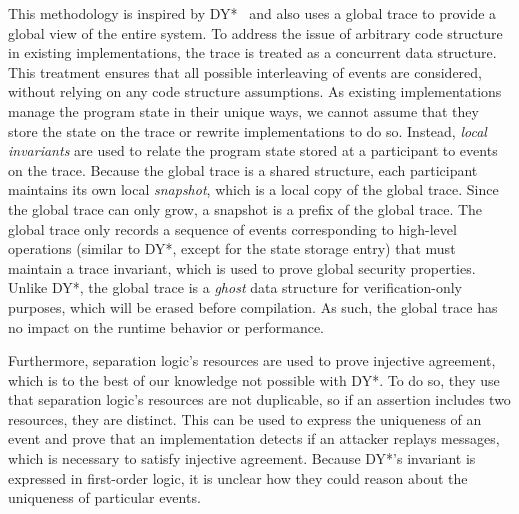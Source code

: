 This methodology is inspired by DY*~\cite{bhargavan2021text} and also uses a global trace to provide a global view of the entire system.
To address the issue of arbitrary code structure in existing implementations, the trace is treated as a concurrent data structure.
This treatment ensures that all possible interleaving of events are considered, without relying on any code structure assumptions.
As existing implementations manage the program state in their unique ways, we cannot assume that they store the state on the trace or rewrite implementations to do so. Instead, \emph{local invariants} are used to relate the program state stored at a participant to events on the trace.
Because the global trace is a shared structure, each participant maintains its own local \emph{snapshot}, which is a local copy of the global trace. Since the global trace can only grow, a snapshot is a prefix of the global trace. 
The global trace only records a sequence of events corresponding to high-level operations (similar to DY*, except for the state storage entry) that must maintain a trace invariant, which is used to prove global security properties.
Unlike DY*, the global trace is a \emph{ghost} data structure for verification-only purposes, which will be erased before compilation. As such, the global trace has no impact on the runtime behavior or performance.

Furthermore, separation logic's resources are used to prove injective agreement, which is to the best of our knowledge not possible with DY*.
To do so, they use that separation logic's resources are not duplicable, so if an assertion includes two resources, they are distinct.
This can be used to express the uniqueness of an event and prove that an implementation detects if an attacker replays messages, which is necessary to satisfy injective agreement.
Because DY*'s invariant is expressed in first-order logic, it is unclear how they could reason about the uniqueness of particular events.

